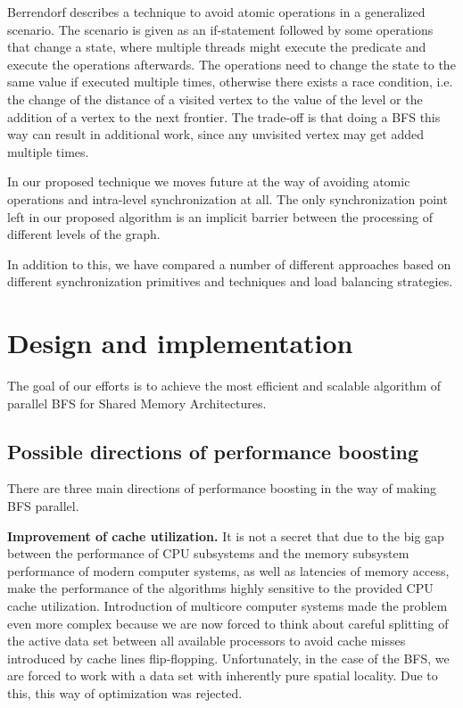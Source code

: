 \documentclass[letterpaper]{article}
\begin{document}
		Berrendorf\cite{Berrendorf:14} describes a technique to avoid atomic operations in a generalized scenario. 
		The scenario is given as an if-statement followed by some operations that change a state, where multiple threads might execute the predicate and execute the operations afterwards. 
		The operations need to change the state to the same value if executed multiple times, otherwise there exists a race condition, i.e. the change of the distance of a visited vertex to the value of the level or the addition of a vertex to the next frontier. 
		The trade-off is that doing a BFS this way can result in additional work, since any unvisited vertex may get added multiple times.
		
		In our proposed technique we moves future at the way of avoiding atomic operations and intra-level synchronization at all.   %
		The only synchronization point left in our proposed algorithm is an implicit barrier between the processing of different levels of the graph.
		
		In addition to this, we have compared a number of different approaches based on different synchronization primitives and techniques and load balancing strategies.
	
	
	
	
	\section{Design and implementation}\label{sec:deim} %
		The goal of our efforts is to achieve the most efficient and scalable algorithm of parallel BFS for Shared Memory Architectures. 

		\subsection{Possible directions of performance boosting}
			There are three main directions of performance boosting in the way of making BFS parallel.
			
			\textbf{Improvement of cache utilization.}
			It is not a secret that due to the big gap between the performance of CPU subsystems and the memory subsystem performance of modern computer systems, as well as latencies of memory access, make the performance of the algorithms highly sensitive to the provided CPU cache utilization. 
			Introduction of multicore computer systems made the problem even more complex because  we are now forced to think about careful splitting of the active data set between all available processors to avoid cache misses introduced by cache lines flip-flopping. 
			Unfortunately, in the case of the BFS, we are forced to work with a data set with inherently pure spatial locality. 
			Due to this, this way of optimization was rejected.
			
\end{document}

